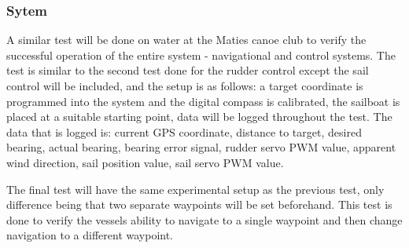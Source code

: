 \subsubsection{Sytem}
A similar test will be done on water at the Maties canoe club to verify the successful operation of the entire system - navigational and control systems. The test
is similar to the second test done for the rudder control except the sail control will be included, and the setup is as follows: a target coordinate is 
programmed into the system and the digital compass is calibrated, the sailboat is placed at a suitable starting point, data will be logged throughout the test. 
The data that is logged is: current GPS coordinate, distance to target, desired bearing, actual bearing, bearing error signal, rudder servo PWM value, apparent 
wind direction, sail position value, sail servo PWM value.

The final test will have the same experimental setup as the previous test, only difference being that two separate waypoints will be set beforehand. This test is 
done to verify the vessels ability to navigate to a single waypoint and then change navigation to a different waypoint. 






